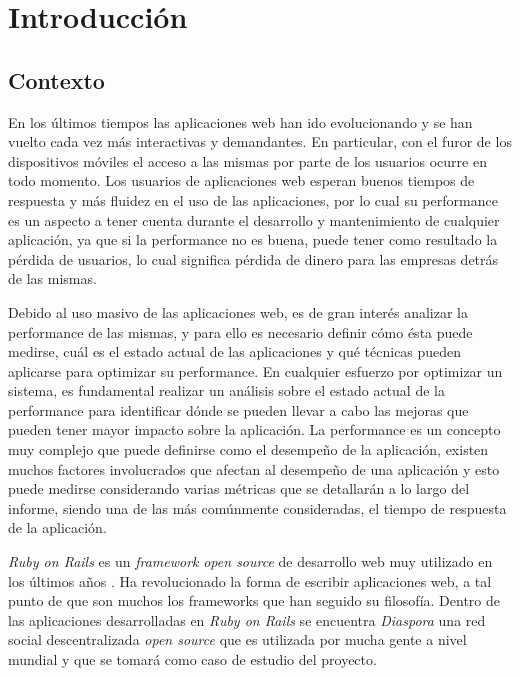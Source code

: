 \chapter{Introducción}
\label{capitulo1}

\section{Contexto}
\label{capitulo1:contexto}

En los últimos tiempos las aplicaciones web han ido evolucionando y se han vuelto cada vez más interactivas y demandantes. En particular, con el furor de los dispositivos móviles el acceso a las mismas por parte de los usuarios ocurre en todo momento.
Los usuarios de aplicaciones web esperan buenos tiempos de respuesta y más fluidez en el uso de las aplicaciones, por lo cual su performance es un aspecto a tener cuenta durante el desarrollo y mantenimiento de cualquier aplicación, ya que si la performance no es buena, puede tener como resultado la pérdida de usuarios, lo cual significa pérdida de dinero para las empresas detrás de las mismas.

Debido al uso masivo de las aplicaciones web, es de gran interés analizar la performance de las mismas, y para ello es necesario definir cómo ésta puede medirse, cuál es el estado actual de las aplicaciones y qué técnicas pueden aplicarse para optimizar su performance. 
En cualquier esfuerzo por optimizar un sistema, es fundamental realizar un análisis sobre el estado actual de la performance para identificar dónde se pueden llevar a cabo
las mejoras que pueden tener mayor impacto sobre la aplicación. 
La performance es un concepto muy complejo que puede definirse como el desempeño de la aplicación, existen muchos factores involucrados que afectan al desempeño de una aplicación y esto puede medirse considerando varias métricas que se detallarán a lo largo del informe, siendo una de las más comúnmente consideradas, el tiempo de respuesta de la aplicación.

\emph{Ruby on Rails} es un \emph{framework} \emph{open source} de desarrollo web muy utilizado en los últimos años \cite{rubyonrails}. Ha revolucionado la forma de escribir aplicaciones web, a tal punto de que son muchos los frameworks que han seguido su filosofía. Dentro de las aplicaciones desarrolladas en \emph{Ruby on Rails} se encuentra \emph{Diaspora} una red social descentralizada \emph{open source} que es utilizada por mucha gente a nivel mundial y que se tomará como caso de estudio del proyecto.


